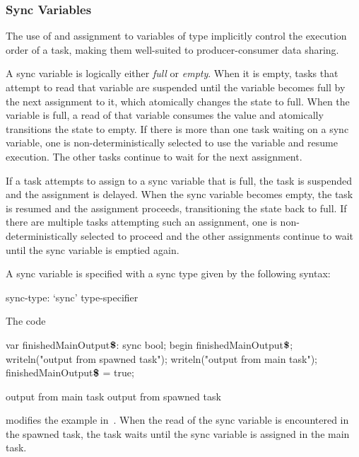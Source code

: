 \subsubsection{Sync Variables}
\label{Sync_Variables}

The use of and assignment to variables of  type implicitly
control the execution order of a task, making them well-suited to
producer-consumer data sharing.

A sync variable is logically either {\em full} or {\em empty}.  When
it is empty, tasks that attempt to read that variable are suspended
until the variable becomes full by the next assignment to it, which
atomically changes the state to full.  When the variable is full, a
read of that variable consumes the value and atomically transitions
the state to empty.  If there is more than one task waiting on a sync
variable, one is non-deterministically selected to use the variable
and resume execution.  The other tasks continue to wait for the next
assignment.

If a task attempts to assign to a sync variable that is full, the task
is suspended and the assignment is delayed.  When the sync variable
becomes empty, the task is resumed and the assignment proceeds,
transitioning the state back to full.  If there are multiple tasks
attempting such an assignment, one is non-deterministically selected
to proceed and the other assignments continue to wait until the sync
variable is emptied again.

A sync variable is specified with a sync type given by the following
syntax:
\begin{syntax}
sync-type:
  `sync' type-specifier
\end{syntax}

\begin{example}
The code
\begin{chapelpre}
\end{chapelpre}
\begin{chapel}
var finishedMainOutput$\mbox{{\bf \$}}$: sync bool;
begin {
  finishedMainOutput$\mbox{{\bf \$}}$;
  writeln("output from spawned task");
}
writeln("output from main task");
finishedMainOutput$\mbox{{\bf \$}}$ = true;
\end{chapel}
\begin{chapeloutput}
output from main task
output from spawned task
\end{chapeloutput}
modifies the example in~.  When the read of the sync
variable is encountered in the spawned task, the task waits until the
sync variable is assigned in the main task.
\end{example}

